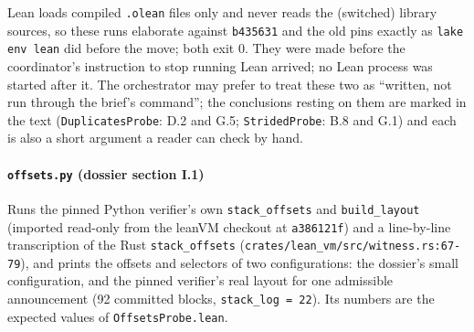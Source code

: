 \begin{itemize}

Lean loads compiled \texttt{.\allowbreak{}olean} files only and never reads the (switched) library sources, so these runs elaborate against \texttt{b435631} and the old pins exactly as \texttt{lake env lean} did before the move; both exit 0. They were made before the coordinator's instruction to stop running Lean arrived; no Lean process was started after it. The orchestrator may prefer to treat these two as \enquote{written, not run through the brief's command}; the conclusions resting on them are marked in the text (\texttt{DuplicatesProbe}: D.2 and G.5; \texttt{StridedProbe}: B.8 and G.1) and each is also a short argument a reader can check by hand.
\end{itemize}

\paragraph{\texttt{offsets.\allowbreak{}py} (dossier section I.1)}\label{sec:gen-layer1-I1}

Runs the pinned Python verifier's own \texttt{stack\_\allowbreak{}offsets} and \texttt{build\_\allowbreak{}layout} (imported read-only from the leanVM checkout at \texttt{a386121f}) and a line-by-line transcription of the Rust \texttt{stack\_\allowbreak{}offsets} (\texttt{c\allowbreak{}r\allowbreak{}a\allowbreak{}t\allowbreak{}e\allowbreak{}s\allowbreak{}/\allowbreak{}l\allowbreak{}e\allowbreak{}a\allowbreak{}n\allowbreak{}\_\allowbreak{}v\allowbreak{}m\allowbreak{}/\allowbreak{}s\allowbreak{}r\allowbreak{}c\allowbreak{}/\allowbreak{}w\allowbreak{}i\allowbreak{}t\allowbreak{}n\allowbreak{}e\allowbreak{}s\allowbreak{}s\allowbreak{}.\allowbreak{}r\allowbreak{}s\allowbreak{}:\allowbreak{}6\allowbreak{}7\allowbreak{}-{}\allowbreak{}7\allowbreak{}9}), and prints the offsets and selectors of two configurations: the dossier's small configuration, and the pinned verifier's real layout for one admissible announcement (92 committed blocks, \texttt{stack\_\allowbreak{}log = 22}). Its numbers are the expected values of \texttt{OffsetsProbe.\allowbreak{}lean}.

